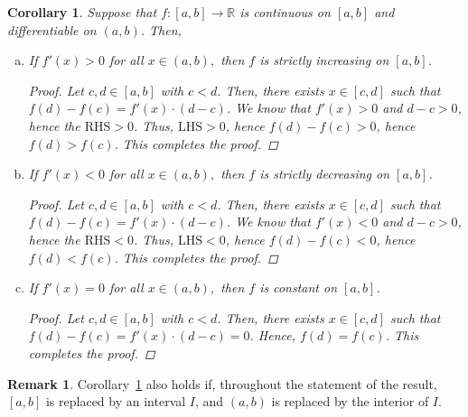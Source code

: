 \documentclass[11pt]{article}
\newcommand{\bbR}{\mathbb{R}}
\renewcommand{\_}[1]{\underline{ #1 }}
\newtheorem{corollary}[theorem]{Corollary}
\theoremstyle{definition}
\newtheorem{remark}[theorem]{Remark}
\numberwithin{equation}{subsection}
\begin{document}
\begin{corollary}
	\label{cor:MVTapps}
	Suppose that $f\colon [a, b] \to \bbR$ is continuous on $[a, b]$ and differentiable on $(a, b)$. Then,
	\begin{enumerate}[(a)]
		\item If $f'(x)>0$ for all $x \in (a, b), $ then $f$ is strictly increasing on $[a, b]$.
        
\begin{proof}
Let $c,d\in [a,b]$ with $c<d$. Then, there exists $x \in [c,d]$ such that $f(d)-f(c)=f'(x)\cdot (d-c)$. We know that $f'(x)>0$ and $d-c>0$, hence the $\text{RHS} >0$. Thus, $\text{LHS}>0$, hence $f(d)-f(c)>0$, hence $f(d)>f(c)$. This completes the proof.


\renewcommand\qedsymbol{QED}
\end{proof}


		\item If $f'(x)<0$ for all $x \in (a, b), $ then $f$ is strictly decreasing on $[a, b]$.
        
\begin{proof}
Let $c,d\in [a,b]$ with $c<d$. Then, there exists $x \in [c,d]$ such that $f(d)-f(c)=f'(x)\cdot (d-c)$. We know that $f'(x)<0$ and $d-c>0$, hence the $\text{RHS} <0$. Thus, $\text{LHS}<0$, hence $f(d)-f(c)<0$, hence $f(d)<f(c)$. This completes the proof.



\renewcommand\qedsymbol{QED}
\end{proof}


		\item If $f'(x) = 0$ for all $x \in (a, b), $ then $f$ is constant on $[a, b]$.
        
\begin{proof}

Let $c,d\in [a,b]$ with $c<d$. Then, there exists $x \in [c,d]$ such that $f(d)-f(c)=f'(x)\cdot (d-c) =0$. Hence, $f(d)=f(c)$. This completes the proof.


\renewcommand\qedsymbol{QED}
\end{proof}


	\end{enumerate}
\end{corollary}

\begin{remark}\label{remark10.15}
	Corollary~\ref{cor:MVTapps} also holds if, throughout the statement of the result, $[a, b]$ is replaced by an interval $I$, and $(a, b)$ is replaced by the interior of $I$.
\end{remark} 
\end{document}
